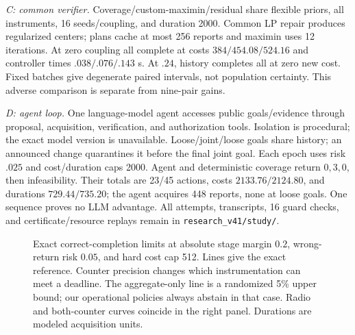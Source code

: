 \emph{C: common verifier.} Coverage/custom-maximin/residual share flexible priors, all instruments, 16 seeds/coupling, and duration 2000. Common LP repair produces regularized centers; plans cache at most 256 reports and maximin uses 12 iterations. At zero coupling all complete at costs $384/454.08/524.16$ and controller times $.038/.076/.143$ s. At $.24$, history completes all at zero new cost. Fixed batches give degenerate paired intervals, not population certainty. This adverse comparison is separate from nine-pair gains.

\emph{D: agent loop.} One language-model agent accesses public goals/evidence through proposal, acquisition, verification, and authorization tools. Isolation is procedural; the exact model version is unavailable. Loose/joint/loose goals share history; an announced change quarantines it before the final joint goal. Each epoch uses risk $.025$ and cost/duration caps 2000. Agent and deterministic coverage return $0,3,0$, then infeasibility. Their totals are 23/45 actions, costs $2133.76/2124.80$, and durations $729.44/735.20$; the agent acquires 448 reports, none at loose goals. One sequence proves no LLM advantage. All attempts, transcripts, 16 guard checks, and certificate/resource replays remain in \texttt{research\_v41/study/}.

\begin{figure}[t]
\centering
\resizebox{\textwidth}{!}{}
\caption{Exact correct-completion limits at absolute stage margin $0.2$,
wrong-return risk $0.05$, and hard cost cap 512. Lines give the exact
reference. Counter precision changes
which instrumentation can meet a deadline. The aggregate-only line is a
randomized 5\% upper bound; our operational policies always abstain in
that case. Radio and both-counter curves coincide in the right panel.
Durations are modeled acquisition units.}
\label{fig:v42-scalar-frontier}
\end{figure}


